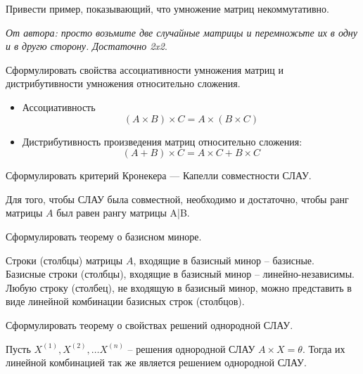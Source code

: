 \begin{question}
  Привести пример, показывающий, что умножение матриц некоммутативно.
\end{question} 
\begin{answer}
   \textit{От автора: просто возьмите две случайные матрицы и перемножьте их в одну и в другю сторону. Достаточно 2x2}. 
\end{answer} 

\begin{question}
  Сформулировать свойства ассоциативности умножения матриц и дистрибутивности умножения относительно сложения.
\end{question} 
\begin{answer}
  \begin{itemize}.
    \item Ассоциативность \[
      (A \times B) \times C = A \times (B \times C)
    \]
    \item Дистрибутивность произведения матриц относительно сложения: \[
      (A + B) \times C = A \times C + B \times C
    \] 
  \end{itemize} 
\end{answer} 

\begin{question}
  Сформулировать критерий Кронекера — Капелли совместности СЛАУ.
\end{question} 
\begin{answer}
  Для того, чтобы СЛАУ была совместной, необходимо и достаточно, чтобы ранг матрицы $A$ был равен рангу матрицы A|B.
\end{answer} 

\begin{question}
  Сформулировать теорему о базисном миноре.
\end{question} 
\begin{answer}
  Строки (столбцы) матрицы $A$, входящие в базисный минор -- базисные. \\
  Базисные строки (столбцы), входящие в базисный минор -- линейно-независимы. \\
  Любую строку (столбец), не входящую в базисный минор, можно представить в виде линейной комбинации базисных строк (столбцов).
\end{answer} 

\begin{question}
  Сформулировать теорему о свойствах решений однородной СЛАУ.
\end{question} 
\begin{answer}
  Пусть $X^{(1)}, X^{(2)}, \ldots X^{(n)}$ -- решения однородной СЛАУ $A \times X = \theta$. Тогда их линейной комбинацией так же является решением однородной СЛАУ.
\end{answer} 

